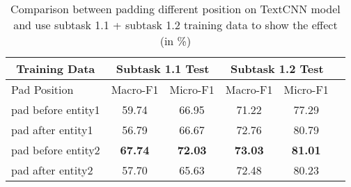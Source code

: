 \begin{table}[htbp!] %
    \centering
    \begin{tabular}{lccccc}
    \toprule
        \multicolumn{1}{c}{Training Data}          & \multicolumn{2}{c}{Subtask 1.1 Test}  & \multicolumn{2}{c}{Subtask 1.2 Test} \\
    \midrule
        Pad Position                               & Macro-F1         & Micro-F1           & Macro-F1         & Micro-F1       \\
    \midrule
        pad before entity1                         & 59.74            & 66.95              & 71.22            & 77.29         \\
        pad after entity1                          & 56.79            & 66.67              & 72.76            & 80.79         \\
        pad before entity2                         & \bf67.74         & \bf72.03           & \bf73.03         & \bf81.01      \\
        pad after entity2                          & 57.70            & 65.63              & 72.48            & 80.23         \\
    \bottomrule
    \end{tabular}
\caption{Comparison between padding different position on TextCNN model and use subtask 1.1 + subtask 1.2 training data to show the effect (in \%)}
\label{tab:data_pad}
\end{table}
